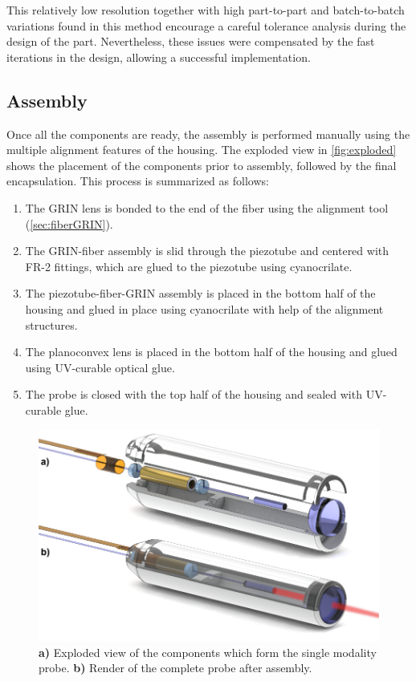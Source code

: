 \documentclass[10pt]{iopart}
\begin{document}
This relatively low resolution together with high part-to-part and batch-to-batch variations found in this method encourage a careful tolerance analysis during the design of the part. Nevertheless, these issues were compensated by the fast iterations in the design, allowing a successful implementation.


\subsection{Assembly}

Once all the components are ready, the assembly is performed manually using the multiple alignment features of the housing. The exploded view in \autoref{fig:exploded} shows the placement of the components prior to assembly, followed by the final encapsulation. This process is summarized as follows:

\begin{enumerate}
\item The GRIN lens is bonded to the end of the fiber using the alignment tool (\autoref{sec:fiberGRIN}).
\item The GRIN-fiber assembly is slid through the piezotube and centered with FR-2 fittings, which are glued to the piezotube using cyanocrilate.
\item The piezotube-fiber-GRIN assembly is placed in the bottom half of the housing and glued in place using cyanocrilate with help of the alignment structures.
\item The planoconvex lens is placed in the bottom half of the housing and glued using UV-curable optical glue.
\item The probe is closed with the top half of the housing and sealed with UV-curable glue.
\end{enumerate}

\begin{figure}[h!]\centering \includegraphics[width=\columnwidth]{figures/explodedRenderLaser.pdf}
      \caption{\textbf{a)} Exploded view of the components which form the single modality probe.
      \textbf{b)} Render of the complete probe after assembly.}
      \label{fig:exploded}
\end{figure}
\end{document}
